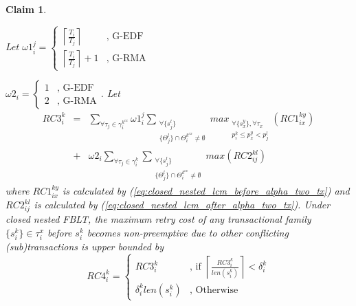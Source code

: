\documentclass[10pt, conference, compsocconf]{IEEEtran}
\newtheorem{clm}{Claim}
\begin{document}
\begin{clm}\label{clm:closed_nested_lcm_before_delta}

Let $\omega1_{i}^{j}=\begin{cases}
\left\lceil \frac{T_{i}}{T_{j}}\right\rceil  & \mbox{, G-EDF}\\
\left\lceil \frac{T_{i}}{T_{j}}\right\rceil +1 & \mbox{, G-RMA}
\end{cases}$

$\omega2_{i}=\begin{cases}
1 & \mbox{, G-EDF}\\
2 & \mbox{, G-RMA}
\end{cases}$. Let
\begin{eqnarray}
RC3_{i}^{k} & = & \sum_{\forall\tau_{j}\in\gamma_{i}^{k^{ex}}}\omega1_{i}^{j}\sum_{\begin{array}{cc}
\forall\{s_{j}^{l}\}\\
\{\Theta_{j}^{l}\}\cap\Theta_{i}^{k^{ex}}\neq\emptyset
\end{array}}max_{\begin{array}{cc}
\forall\{s_{x}^{y}\},\forall\tau_{x}\\
p_{i}^{k}\le p_{x}^{y}<p_{j}^{l}
\end{array}}\left(RC1_{ix}^{ky}\right)\nonumber \\
 & + & \omega2_{i}\sum_{\forall\tau_{j}\in\gamma_{i}^{k}}\sum_{\begin{array}{cc}
\forall\{s_{j}^{l}\}\\
\{\Theta_{j}^{l}\}\cap\Theta_{i}^{k^{ex}}\neq\emptyset
\end{array}}max\left(RC2_{ij}^{kl}\right)\label{eq:closed_nested_lcm_before_delta}
\end{eqnarray}
where $RC1_{ix}^{ky}$ is calculated by (\ref{eq:closed_nested_lcm_before_alpha_two_tx})
and $RC2_{ij}^{kl}$ is calculated by (\ref{eq:closed_nested_lcm_after_alpha_two_tx}).
Under closed nested FBLT, the maximum retry cost of any transactional
family $\{s_{i}^{k}\}\in\tau_{i}^{x}$ before $s_{i}^{k}$ becomes
non-preemptive due to other conflicting (sub)transactions is upper
bounded by 
\begin{equation}
RC4_{i}^{k}=\begin{cases}
RC3_{i}^{k} & \mbox{, if }\left\lceil \frac{RC3_{i}^{k}}{len\left(s_{i}^{k}\right)}\right\rceil <\delta_{i}^{k}\\
\delta_{i}^{k}len\left(s_{i}^{k}\right) & \mbox{, Otherwise}
\end{cases}\label{eq:closed_nested_fblt_before_delta}
\end{equation}

\end{clm}
\end{document}
